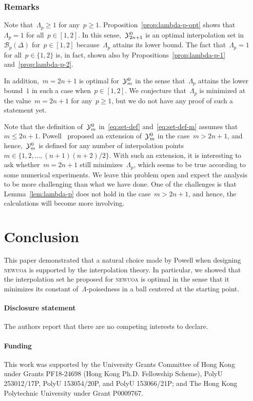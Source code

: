 \documentclass[draft]{article}
\numberwithin{equation}{section}
\theoremstyle{definition}
\theoremstyle{plain}
\theoremstyle{remark}
\newcommand*{\set}[2][]{#1\{#2#1\}}
\newcommand*{\solvername}[1]{\textsc{#1}\xspace}
\newcommand*{\xpt}[1][]{\mathcal{Y}\ifblank{#1}{}{^{#1}}}
\begin{document}
\subsubsection{Remarks}

Note that~$\Lambda_p \ge 1$ for any~$p \ge 1$.
Proposition~\ref{prop:lambda-p-opt} shows that~$\Lambda_p = 1$ for all~$p \in [1, 2]$.
In this sense,~$\xpt[0]_{2n + 1}$ is an optimal interpolation set in~$\mathcal{B}_p(\Delta)$ for~$p \in [1, 2]$ because~$\Lambda_p$ attains its lower bound.
The fact that~$\Lambda_p = 1$ for all~$p \in \set{1, 2}$ is, in fact, shown also by Propositions~\ref{prop:lambda-p-1} and~\ref{prop:lambda-p-2}.

In addition,~$m = 2n + 1$ is optimal for~$\xpt[0]_m$ in the sense that~$\Lambda_p$ attains the lower bound~$1$ in such a case when~$p \in [1, 2]$.
We conjecture that~$\Lambda_p$ is minimized at the value~$m = 2n + 1$ for any~$p \ge 1$, but we do not have any proof of such a statement yet.

Note that the definition of~$\xpt[0]_m$ in~\eqref{eq:set-def} and~\eqref{eq:set-def-m} assumes that~$m \le 2n + 1$.
Powell~\cite{Powell_2006} proposed an extension of~$\xpt[0]_m$ in the case~$m > 2n + 1$, and hence,~$\xpt[0]_m$ is defined for any number of interpolation points~$m \in \set{1, 2, \dots, (n + 1) (n + 2) / 2}$.
With such an extension, it is interesting to ask whether~$m = 2n + 1$ still minimizes~$\Lambda_p$, which seems to be true according to some numerical experiments.
We leave this problem open and expect the analysis to be more challenging than what we have done.
One of the challenges is that Lemma~\ref{lem:lambda-p} does not hold in the case~$m > 2n + 1$, and hence, the calculations will become more involving.

\section{Conclusion}

This paper demonstrated that a natural choice made by Powell when designing \solvername{newuoa} is supported by the interpolation theory.
In particular, we showed that the interpolation set he proposed for \solvername{newuoa} is optimal in the sense that it minimizes its constant of~$\Lambda$-poisedness in a ball centered at the starting point.

\paragraph*{Disclosure statement}
The authors report that there are no competing interests to declare.

\paragraph*{Funding}
This work was supported by the University Grants Committee of Hong Kong under Grants PF18-24698 (Hong Kong Ph.D. Fellowship Scheme), PolyU 253012/17P, PolyU 153054/20P, and PolyU 153066/21P; and The Hong Kong Polytechnic University under Grant P0009767.



\end{document}
